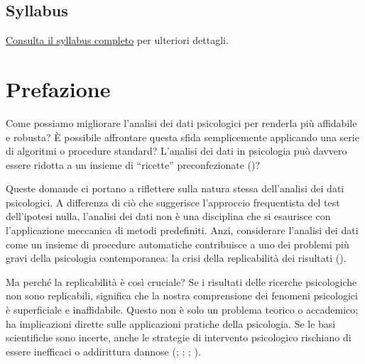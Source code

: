 \documentclass[
  letterpaper,
]{krantz}
\begin{document}
\section*{Syllabus}\label{syllabus}


\href{syllabus/syllabus.pdf}{Consulta il syllabus completo} per
ulteriori dettagli.


\chapter*{Prefazione}\label{prefazione}


Come possiamo migliorare l'analisi dei dati psicologici per renderla più
affidabile e robusta? È possibile affrontare questa sfida semplicemente
applicando una serie di algoritmi o procedure standard? L'analisi dei
dati in psicologia può davvero essere ridotta a un insieme di
``ricette'' preconfezionate
()?

Queste domande ci portano a riflettere sulla natura stessa dell'analisi
dei dati psicologici. A differenza di ciò che suggerisce l'approccio
frequentista del test dell'ipotesi nulla, l'analisi dei dati non è una
disciplina che si esaurisce con l'applicazione meccanica di metodi
predefiniti. Anzi, considerare l'analisi dei dati come un insieme di
procedure automatiche contribuisce a uno dei problemi più gravi della
psicologia contemporanea: la crisi della replicabilità dei risultati
().

Ma perché la replicabilità è così cruciale? Se i risultati delle
ricerche psicologiche non sono replicabili, significa che la nostra
comprensione dei fenomeni psicologici è superficiale e inaffidabile.
Questo non è solo un problema teorico o accademico; ha implicazioni
dirette sulle applicazioni pratiche della psicologia. Se le basi
scientifiche sono incerte, anche le strategie di intervento psicologico
rischiano di essere inefficaci o addirittura dannose
(;
;
;
).
\end{document}
